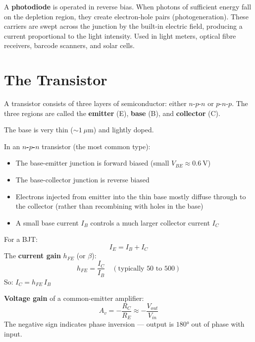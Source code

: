 \begin{defbox}[Photodiode]
A \textbf{photodiode} is operated in reverse bias.
When photons of sufficient energy fall on the
depletion region, they create electron-hole pairs
(photogeneration). These carriers are swept across
the junction by the built-in electric field, producing
a current proportional to the light intensity. Used
in light meters, optical fibre receivers, barcode
scanners, and solar cells.
\end{defbox}

\section{The Transistor}

\begin{definitionbox}
A transistor consists of three layers of semiconductor:
either $n$-$p$-$n$ or $p$-$n$-$p$. The three
regions are called the \textbf{emitter} (E),
\textbf{base} (B), and \textbf{collector} (C).

The base is very thin ($\sim 1\ \mu\text{m}$) and
lightly doped.

In an \textbf{$n$-$p$-$n$} transistor (the most
common type):
\begin{itemize}[noitemsep]
  \item The base-emitter junction is forward biased
  (small $V_{BE} \approx 0.6\ \text{V}$)
  \item The base-collector junction is reverse biased
  \item Electrons injected from emitter into the thin
  base mostly diffuse through to the collector
  (rather than recombining with holes in the base)
  \item A small base current $I_B$ controls a much
  larger collector current $I_C$
\end{itemize}
\end{definitionbox}

\begin{lawbox}
For a BJT:
\[
  I_E = I_B + I_C
\]
The \textbf{current gain} $h_{FE}$ (or $\beta$):
\[
  h_{FE} = \frac{I_C}{I_B}
  \quad (\text{typically } 50 \text{ to } 500)
\]
So: $I_C = h_{FE}\,I_B$

\textbf{Voltage gain} of a common-emitter amplifier:
\[
  A_v = -\frac{R_C}{R_E}
  \approx -\frac{V_{out}}{V_{in}}
\]
The negative sign indicates phase inversion --- output
is $180°$ out of phase with input.
\end{lawbox}

